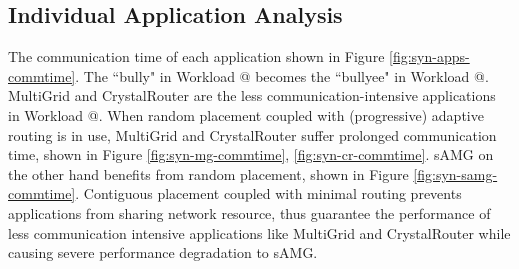 \documentclass[conference,compsoc]{IEEEtran}
\makeatletter
\newcommand{\Rmnum}[1]{\expandafter\@slowromancap\romannumeral #1@}
\makeatother
\begin{document}
\subsection{Individual Application Analysis}
\label{sec: workload-2 app analysis}

The communication time of each application shown in Figure \ref{fig:syn-apps-commtime}. The ``bully" in Workload \Rmnum{1} becomes the ``bullyee" in Workload \Rmnum{2}. MultiGrid and CrystalRouter are the less communication-intensive applications in Workload \Rmnum{2}.  When random placement coupled with (progressive) adaptive routing is in use, MultiGrid and CrystalRouter suffer prolonged communication time, shown in Figure \ref{fig:syn-mg-commtime}, \ref{fig:syn-cr-commtime}. sAMG on the other hand benefits from random placement, shown in Figure \ref{fig:syn-samg-commtime}. Contiguous placement coupled with minimal routing prevents applications from sharing network resource, thus guarantee the performance of less communication intensive applications like MultiGrid and CrystalRouter while causing severe performance degradation to sAMG.
\end{document}
